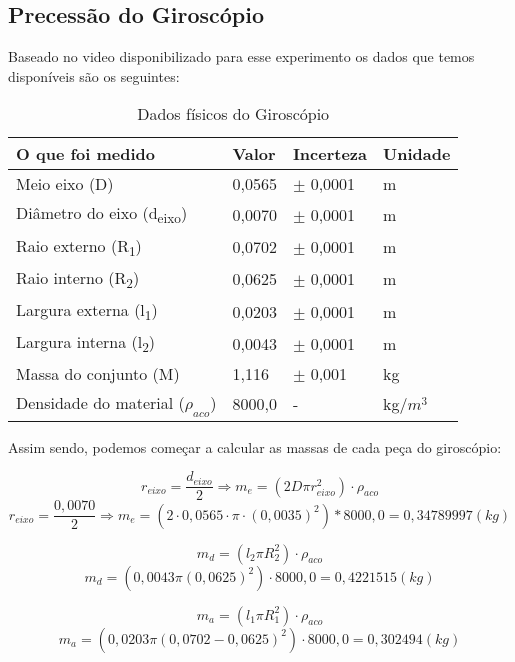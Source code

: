 \subsection{Precessão do Giroscópio}

Baseado no video disponibilizado para esse experimento os dados que temos disponíveis são os seguintes:

\begin{table}[H]
    \centering
    \begin{tabular}{ |M{5cm}||M{2cm}||M{2cm}||M{2cm}|  }
        \hline
        \textbf{O que foi medido} & \textbf{Valor} & \textbf{Incerteza} & \textbf{Unidade}\\
        \hline
        Meio eixo (D)                               & 0,0565    & $\pm$ 0,0001  & m\\
        Diâmetro do eixo (d\textsubscript{eixo})    & 0,0070    & $\pm$ 0,0001  & m\\
        Raio externo (R\textsubscript{1})           & 0,0702    & $\pm$ 0,0001  & m\\
        Raio interno (R\textsubscript{2})           & 0,0625    & $\pm$ 0,0001  & m\\
        Largura externa (l\textsubscript{1})        & 0,0203    & $\pm$ 0,0001  & m\\
        Largura interna (l\textsubscript{2})        & 0,0043    & $\pm$ 0,0001  & m\\
        Massa do conjunto (M)                       & 1,116     & $\pm$ 0,001   & kg\\
        Densidade do material ($\rho _{aco}$)       & 8000,0    & -             & kg/$m^3$\\
        \hline
    \end{tabular}
    \caption{Dados físicos do Giroscópio}
\end{table}

Assim sendo, podemos começar a calcular as massas de cada peça do giroscópio:

\[ r_{eixo} = \frac{d_{eixo}}{2} \Rightarrow m_e = (2 D \pi r_{eixo}^2) \cdot \rho_{aco} \]
\[ r_{eixo} = \frac{0,0070}{2} \Rightarrow m_e = (2 \cdot 0,0565 \cdot \pi \cdot (0,0035)^2) * 8000,0 = 0,34789997 (kg)\]

\[ m_d = (l_2 \pi R_2^2) \cdot \rho_{aco} \]
\[ m_d = (0,0043 \pi (0,0625)^2) \cdot 8000,0 = 0,4221515 (kg) \]

\[ m_a = (l_1 \pi R_1^2) \cdot \rho_{aco} \]
\[ m_a = (0,0203 \pi (0,0702 - 0,0625)^2) \cdot 8000,0 = 0,302494 (kg) \]

